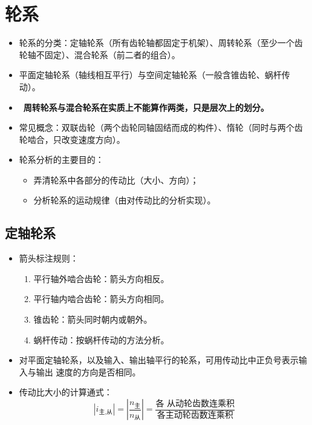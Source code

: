 \documentclass[12pt,a4paper]{article}
\newcommand{\tightlist}{\setlength{\parskip}{0pt}\setlength{\itemsep}{0pt}}
\newcommand{\hint}[1]{\textsf{（#1）}}
\renewcommand{\emph}[1]{\faIcon[regular]{lightbulb}\ \textbf{#1}}
\begin{document}
\section{轮系}
\begin{itemize}\tightlist
    \item 轮系的分类：定轴轮系\hint{所有齿轮轴都固定于机架}、周转轮系\hint{至少一个齿
    轮轴不固定}、混合轮系\hint{前二者的组合}。
    \item 平面定轴轮系\hint{轴线相互平行}与空间定轴轮系\hint{一般含锥齿轮、蜗杆传动}。
    \item \emph{周转轮系与混合轮系在实质上不能算作两类，只是层次上的划分。}
    \item 常见概念：双联齿轮\hint{两个齿轮同轴固结而成的构件}、惰轮\hint{同时与两个齿
    轮啮合，只改变速度方向}。
    \item 轮系分析的主要目的：
    \begin{itemize}
        \item 弄清轮系中各部分的传动比\hint{大小、方向}；
        \item 分析轮系的运动规律\hint{由对传动比的分析实现}。
    \end{itemize}
\end{itemize}

\subsection{定轴轮系}
\begin{itemize}\tightlist
    \item 箭头标注规则：
    \begin{enumerate}\tightlist
        \item 平行轴外啮合齿轮：箭头方向相反。
        \item 平行轴内啮合齿轮：箭头方向相同。
        \item 锥齿轮：箭头同时朝内或朝外。
        \item 蜗杆传动：按蜗杆传动的方法分析。
    \end{enumerate}
    \item 对平面定轴轮系，以及输入、输出轴平行的轮系，可用传动比中正负号表示输入与输出
    速度的方向是否相同。
    \item 传动比大小的计算通式：
    \begin{equation}
    |i_\text{主,从}|=\left|\frac{n_\text{主}}{n_\text{从}}\right|=\frac{\text{各
    从动轮齿数连乘积}}{\text{各主动轮齿数连乘积}}
    \end{equation}
\end{itemize}
\end{document}
